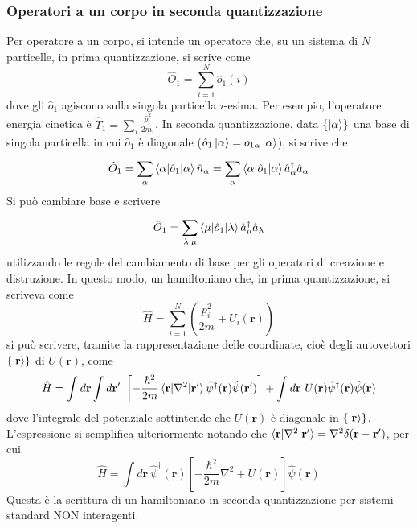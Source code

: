 \documentclass[11pt, a4paper]{scrartcl}
\theoremstyle{style}
\theoremstyle{style1}
\numberwithin{equation}{subsection}
\begin{document}
\subsubsection{Operatori a un corpo in seconda quantizzazione}
Per operatore a un corpo, si intende un operatore che, su un sistema di $N$ particelle, in prima quantizzazione, si scrive come
\[
\hat{O}_1 = \sum_{i=1}^{N} \hat{o}_1(i)
\] 
dove gli $\hat{o}_1$ agiscono sulla singola particella $i$-esima. Per esempio, l'operatore energia cinetica \`e $\hat{T}_1 = \sum_{i}^{} \frac{\hat{p}_i^2}{2m_i}$.
In seconda quantizzazione, data $\left\{ \ket{\alpha }  \right\} $ una base di singola particella in cui $\hat{o}_1$ \`e diagonale ($\hat{o}_1 \ket{\alpha } = o_{1\alpha } \ket{\alpha } $), si scrive che 
\[
\hat{O}_1 = \sum_{\alpha }^{}\braket{\alpha |\hat{o}_1|\alpha } \hat{n}_\alpha =\sum_{\alpha }^{}\braket{\alpha |\hat{o}_1|\alpha } \hat{a}_\alpha ^\dagger \hat{a}_\alpha  
\] 
Si pu\`o cambiare base e scrivere
\[
\hat{O}_1 = \sum_{\lambda ,\mu }^{}\braket{\mu |\hat{o}_1|\lambda } \hat{a}_\mu ^\dagger \hat{a}_\lambda 
\] 
utilizzando le regole del cambiamento di base per gli operatori di creazione e distruzione.
In questo modo, un hamiltoniano che, in prima quantizzazione, si scriveva come
\[
\hat{H} = \sum_{i=1}^{N} \left(\frac{p_i^2}{2m} + U_i (\mathbf{r} )\right) 
\] 
si pu\`o scrivere, tramite la rappresentazione delle coordinate, cio\`e degli autovettori $\left\{ \ket{\mathbf{r} }  \right\} $ di $U(\mathbf{r} )$, come
\[
\hat{H}= \int d\mathbf{r}  \int d\mathbf{r} ' \ \left[ - \frac{\hbar ^2}{2m}\braket{\mathbf{r} |\nabla ^2|\mathbf{r} '} \hat{\psi } ^\dagger (\mathbf{r} ) \hat{\psi } (\mathbf{r} ')\right] + \int d\mathbf{r} \ U(\mathbf{r} ) \hat{\psi }^\dagger (\mathbf{r} ) \hat{\psi} (\mathbf{r} )
\] 
dove l'integrale del potenziale sottintende che $U(\mathbf{r} )$ \`e diagonale in $\left\{ \ket{\mathbf{r} }  \right\} $.
L'espressione si semplifica ulteriormente notando che $\braket{\mathbf{r} |\nabla ^2| \mathbf{r} '}  = \nabla ^2 \delta (\mathbf{r} -\mathbf{r} ')$, per cui
\begin{equation}
\hat{H}= \int d\mathbf{r} \ \hat{\psi }^\dagger (\mathbf{r} ) \left[ -\frac{\hbar ^2}{2m}\nabla ^2 + U(\mathbf{r} ) \right] \hat{\psi }(\mathbf{r} )
\end{equation}
Questa \`e la scrittura di un hamiltoniano in seconda quantizzazione per sistemi standard NON interagenti.
\end{document}
